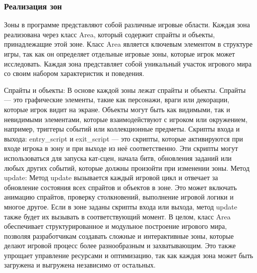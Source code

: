 \subsubsection{Реализация зон}
Зоны в программе представляют собой различные игровые области. Каждая зона реализована через класс Area, который содержит спрайты и объекты, принадлежащие этой зоне. Класс Area является ключевым элементом в структуре игры, так как он определяет отдельные игровые зоны, которые игрок может исследовать. Каждая зона представляет собой уникальный участок игрового мира со своим набором характеристик и поведения.

Спрайты и объекты: В основе каждой зоны лежат спрайты и объекты. Спрайты — это графические элементы, такие как персонажи, враги или декорации, которые игрок видит на экране. Объекты могут быть как видимыми, так и невидимыми элементами, которые взаимодействуют с игроком или окружением, например, триггеры событий или коллекционные предметы.
Скрипты входа и выхода: entry\_script и exit\_script — это скрипты, которые активируются при входе игрока в зону и при выходе из неё соответственно. Эти скрипты могут использоваться для запуска кат-сцен, начала битв, обновления заданий или любых других событий, которые должны произойти при изменении зоны.
Метод update: Метод update вызывается каждый игровой цикл и отвечает за обновление состояния всех спрайтов и объектов в зоне. Это может включать анимацию спрайтов, проверку столкновений, выполнение игровой логики и многое другое. Если в зоне заданы скрипты входа или выхода, метод update также будет их вызывать в соответствующий момент.
В целом, класс Area обеспечивает структурированное и модульное построение игрового мира, позволяя разработчикам создавать сложные и интерактивные зоны, которые делают игровой процесс более разнообразным и захватывающим. Это также упрощает управление ресурсами и оптимизацию, так как каждая зона может быть загружена и выгружена независимо от остальных.
